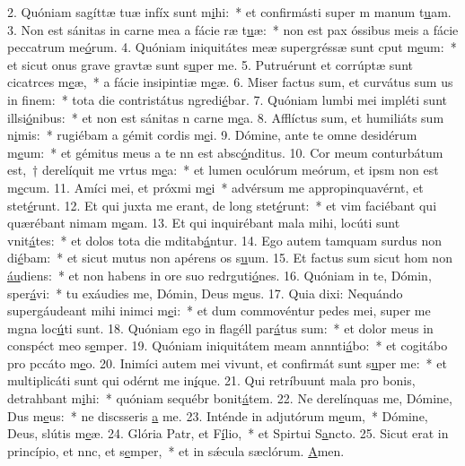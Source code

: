 2. Quóniam sagíttæ tuæ infíx sunt m\uline{i}hi:~* et confirmásti super m manum t\uline{u}am.
3. Non est sánitas in carne mea a fácie ræ t\uline{u}æ:~* non est pax óssibus meis a fácie peccatrum me\uline{ó}rum.
4. Quóniam iniquitátes meæ supergréssæ sunt cput m\uline{e}um:~* et sicut onus grave gravtæ sunt s\uline{u}per me.
5. Putruérunt et corrúptæ sunt cicatrces m\uline{e}æ,~* a fácie insipintiæ m\uline{e}æ.
6. Miser factus sum, et curvátus sum us in f\uline{i}nem:~* tota die contristátus ngredi\uline{é}bar.
7. Quóniam lumbi mei impléti sunt illsi\uline{ó}nibus:~* et non est sánitas n carne m\uline{e}a.
8. Afflíctus sum, et humiliáts sum n\uline{i}mis:~* rugiébam a gémit cordis m\uline{e}i.
9. Dómine, ante te omne desidérum m\uline{e}um:~* et gémitus meus a te nn est absc\uline{ó}nditus.
10. Cor meum conturbátum est,~† derelíquit me vrtus m\uline{e}a:~* et lumen oculórum meórum, et ipsm non est m\uline{e}cum.
11. Amíci mei, et próxmi m\uline{e}i~* advérsum me appropinquavérnt, et stet\uline{é}runt.
12. Et qui juxta me erant, de long stet\uline{é}runt:~* et vim faciébant qui quærébant nimam m\uline{e}am.
13. Et qui inquirébant mala mihi, locúti sunt vnit\uline{á}tes:~* et dolos tota die mditab\uline{á}ntur.
14. Ego autem tamquam surdus non di\uline{é}bam:~* et sicut mutus non apérens os s\uline{u}um.
15. Et factus sum sicut hom non \uline{áu}diens:~* et non habens in ore suo redrguti\uline{ó}nes.
16. Quóniam in te, Dómin, sper\uline{á}vi:~* tu exáudies me, Dómin, Deus m\uline{e}us.
17. Quia dixi: Nequándo supergáudeant mihi inimci m\uline{e}i:~* et dum commovéntur pedes mei, super me mgna loc\uline{ú}ti sunt.
18. Quóniam ego in flagéll par\uline{á}tus sum:~* et dolor meus in conspéct meo s\uline{e}mper.
19. Quóniam iniquitátem meam annnti\uline{á}bo:~* et cogitábo pro pccáto m\uline{e}o.
20. Inimíci autem mei vivunt, et confirmát sunt s\uline{u}per me:~* et multiplicáti sunt qui odérnt me in\uline{í}que.
21. Qui retríbuunt mala pro bonis, detrahbant m\uline{i}hi:~* quóniam sequébr bonit\uline{á}tem.
22. Ne derelínquas me, Dómine, Dus m\uline{e}us:~* ne discsseris \uline{a} me.
23. Inténde in adjutórum m\uline{e}um,~* Dómine, Deus, slútis m\uline{e}æ.
24. Glória Patr, et F\uline{í}lio,~* et Spirtui S\uline{a}ncto.
25. Sicut erat in princípio, et nnc, et s\uline{e}mper,~* et in sǽcula sæclórum. \uline{A}men.
